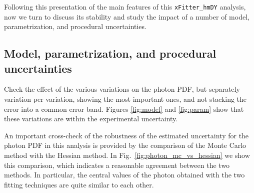 Following this presentation of the main features of this
{\tt xFitter\_hmDY} analysis, now we turn to discuss its stability
and study the impact of a number of model, parametrization,
and procedural uncertainties.

\subsection{Model, parametrization, and procedural uncertainties}

Check the effect of the various variations on the photon PDF, but separately variation per variation,
showing the most important ones, and not stacking the error into a common error band. Figures \ref{fig:model}
and \ref{fig:param} show that these variations are within the experimental uncertainty.


An important cross-check of the robustness of the estimated uncertainty for the photon
PDF in this analysis is provided by the comparison of the Monte Carlo method
with the Hessian method.
%
In Fig.~\ref{fig:photon_mc_vs_hessian} we show this comparison,
which indicates a reasonable agreement between the two methods.
%
In particular, the central values of the photon obtained with the two fitting
techniques are quite similar to each other.


